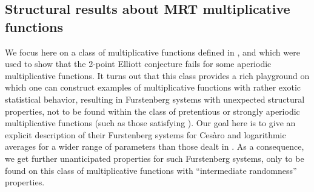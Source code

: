 \documentclass[11pt]{amsart}
\theoremstyle{definition}
\newcommand{\E}{{\mathbb E}}
\begin{document}

\subsection{Structural results about MRT multiplicative functions}\label{SS:MRTresults}
We focus here  on  a class of multiplicative functions  defined in \cite[Appendix~B]{MRT15}, and which were used to show that  the 2-point Elliott conjecture fails for some aperiodic  multiplicative functions. It turns out that this class provides a rich playground on which one can construct examples of multiplicative functions with rather exotic statistical behavior, resulting in Furstenberg systems with unexpected structural properties, not to be found within the class of pretentious or strongly aperiodic multiplicative functions (such as those satisfying \cite[Equation~(1.9)]{MRT15}).
Our goal here  is to give an explicit description of their Furstenberg systems for Ces\`aro and logarithmic averages
for a wider range of parameters than those dealt in \cite{GLR21}.  As a consequence, we get further unanticipated  properties for such Furstenberg systems, only to be found on this class of multiplicative functions  with ``intermediate randomness'' properties.
\end{document}
